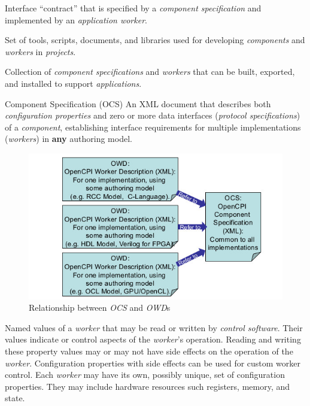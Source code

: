 \begin{description}[style=nextline]
\item[Component]
Interface ``contract'' that is specified by a \textit{component specification} and implemented by an \textit{application worker}.

\item[Component Development Kit]
Set of tools, scripts, documents, and libraries used for developing \textit{components} and \textit{workers} in \textit{projects}.

\item[Component Library]
Collection of \textit{component specifications} and \textit{workers} that can be built, exported, and installed to support \textit{applications}.

\begin{minipage}{\textwidth}
\item[Component Specification (OCS)]
An XML document that describes both \textit{configuration properties} and zero or more data interfaces (\textit{protocol specifications}) of a \textit{component}, establishing interface requirements for multiple implementations (\textit{workers}) in \textbf{any} authoring model.
\begin{figure}[H]
\begin{center}
\includegraphics{./figures/owdtoocs.jpg}
\caption{Relationship between \textit{OCS} and \textit{OWD}s}
\label{fig:relations}
\end{center}
\end{figure}
\end{minipage}

\item[Configuration Properties]
Named values of a \textit{worker} that may be read or written by \textit{control software}. Their values indicate or control aspects of the \textit{worker}'s operation. Reading and writing these property values may or may not have side effects on the operation of the \textit{worker}. Configuration properties with side effects can be used for custom worker control. Each \textit{worker} may have its own, possibly unique, set of configuration properties. They may include hardware resources such registers, memory, and state.


\end{description}
